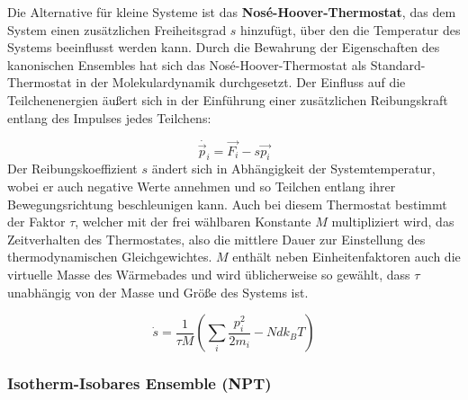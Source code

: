 
Die Alternative für kleine Systeme ist das \textbf{Nosé-Hoover-Thermostat}\cite{nose_unified_1984,hoover_canonical_1985}, das dem System einen zusätzlichen Freiheitsgrad $s$ hinzufügt, über den die Temperatur des Systems beeinflusst werden kann.
Durch die Bewahrung der Eigenschaften des kanonischen Ensembles hat sich das Nosé-Hoover-Thermostat als Standard-Thermostat in der Molekulardynamik durchgesetzt.
Der Einfluss auf die Teilchenenergien äußert sich in der Einführung einer zusätzlichen Reibungskraft entlang des Impulses jedes Teilchens:

\begin{equation}
  \dot{\vec p_i} = \vec{F_i} - s \vec{p_i}
\end{equation}
Der Reibungskoeffizient $s$ ändert sich in Abhängigkeit der Systemtemperatur, wobei er auch negative Werte annehmen und so Teilchen entlang ihrer Bewegungsrichtung beschleunigen kann.
Auch bei diesem Thermostat bestimmt der Faktor $\tau$, welcher mit der frei wählbaren Konstante $M$ multipliziert wird, das Zeitverhalten des Thermostates, also die mittlere Dauer zur Einstellung des thermodynamischen Gleichgewichtes.
$M$ enthält neben Einheitenfaktoren auch die virtuelle Masse des Wärmebades und wird üblicherweise so gewählt, dass $\tau$ unabhängig von der Masse und Größe des Systems ist.

\begin{equation}
  \dot s = \frac{1}{\tau M} \left(\sum_i{\frac{p_i^2}{2m_i}} - N d k_B T\right)
\end{equation}

\subsubsection{Isotherm-Isobares Ensemble (NPT)}

